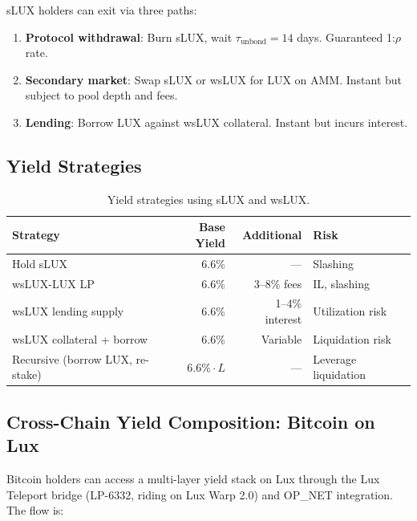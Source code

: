 \begin{definition}
sLUX holders can exit via three paths:
\begin{enumerate}
    \item \textbf{Protocol withdrawal}: Burn sLUX, wait $\tau_{\text{unbond}} = 14$ days. Guaranteed 1:$\rho$ rate.
    \item \textbf{Secondary market}: Swap sLUX or wsLUX for LUX on AMM. Instant but subject to pool depth and fees.
    \item \textbf{Lending}: Borrow LUX against wsLUX collateral. Instant but incurs interest.
\end{enumerate}
\end{definition}

\subsection{Yield Strategies}

\begin{table}[H]
\centering
\caption{Yield strategies using sLUX and wsLUX.}
\label{tab:strategies}
\begin{tabular}{p{4cm}rrp{4cm}}
\toprule
\textbf{Strategy} & \textbf{Base Yield} & \textbf{Additional} & \textbf{Risk} \\
\midrule
Hold sLUX & 6.6\% & --- & Slashing \\
wsLUX-LUX LP & 6.6\% & 3--8\% fees & IL, slashing \\
wsLUX lending supply & 6.6\% & 1--4\% interest & Utilization risk \\
wsLUX collateral + borrow & 6.6\% & Variable & Liquidation risk \\
Recursive (borrow LUX, re-stake) & $6.6\% \cdot L$ & --- & Leverage liquidation \\
\bottomrule
\end{tabular}
\end{table}

\subsection{Cross-Chain Yield Composition: Bitcoin on Lux}\label{sec:btc-yield}

Bitcoin holders can access a multi-layer yield stack on Lux through the Lux Teleport bridge (LP-6332, riding on Lux Warp 2.0) and OP\_NET integration. The flow is:


